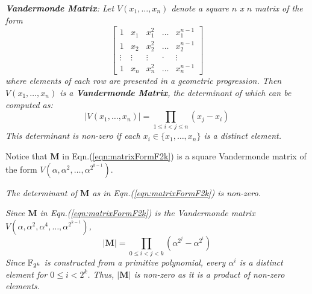 \begin{Definition}\label{def:vandermonde}
{\it {\bf Vandermonde Matrix}: Let $V(x_1,\dots,x_n)$ denote a square $n$ x $n$ matrix of the form
\begin{equation}
\begin{bmatrix}
1 & x_1 & x_1^2  & \dots  & x_1^{n-1} \\
1 & x_2 & x_2^2  & \dots  & x_2^{n-1} \\
\vdots& \vdots  & \vdots & \cdot & \vdots    \\
1 & x_n & x_n^2  & \dots  & x_n^{n-1}
\end{bmatrix}
\end{equation}
where elements of each row are presented in a geometric progression.
Then $V(x_1,\dots,x_n)$ is a {\bf Vandermonde Matrix}, 
the determinant of which can be computed as:
\begin{equation} \label{eqn:vandet}
|V(x_1,\dots,x_n)| = \prod\limits_{1\leq i < j \leq n}(x_j - x_i)
\end{equation}
This determinant is non-zero if each $x_i \in \{x_1,\dots,x_n\}$ is a distinct
element.
}
\end{Definition}

Notice that $\mathbf{M}$ in Eqn.(\ref{eqn:matrixFormF2k}) is a square Vandermonde matrix 
of the form $V(\alpha,\alpha^2,\dots,\alpha^{2^{k-1}})$. 
\begin{Lemma}\label{lemma:nonzero}{\it The determinant of $\mathbf{M}$ as in Eqn.(\ref{eqn:matrixFormF2k}) is non-zero.}\end{Lemma}
\begin{Proof}{
\it Since $\mathbf{M}$ in Eqn.(\ref{eqn:matrixFormF2k}) is the Vandermonde matrix $V(\alpha,\alpha^2,\alpha^4,\dots,\alpha^{2^{k-1}})$, 
\begin{equation}
|\mathbf{M}|=\prod\limits_{0\leq i < j <k}{(\alpha^{2^j}-\alpha^{2^i})}
\end{equation}
Since ${\mathbb{F}}_{2^k}$ is constructed from a primitive polynomial,
every $\alpha^i$ is a distinct element for $0\leq i < 2^k$.  
Thus, $|\mathbf{M}|$ is non-zero as it is a product of non-zero elements.}
\end{Proof}


